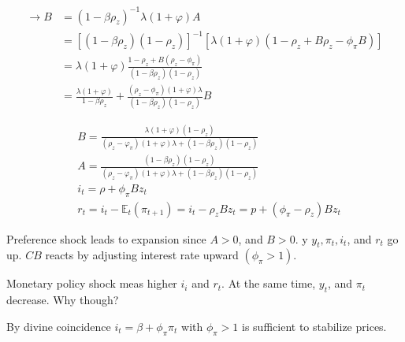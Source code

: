 {\begin{enumerate}[label=(\alph*)]
{$$
\begin{aligned}
\longrightarrow B&=\left(1-\beta \rho_z\right)^{-1} \lambda(1+\varphi) A \\
& =\left[\left(1-\beta \rho_z\right)\left(1-\rho_z\right)\right]^{-1}\left[\lambda(1+\varphi)\left(1-\rho_z+B{\rho_z}-\phi_{\pi} B\right)\right] \\
& =\lambda(1+\varphi) \frac{1-\rho_z+B\left(\rho_z-\phi_{\pi}\right)}{\left(1-\beta \rho_z\right)\left(1-\rho_z\right)} \\
& =\frac{\lambda(1+\varphi)}{1-\beta \rho_z}+\frac{\left(\rho_{z}-\phi_{\pi}\right)(1+\varphi) \lambda}{\left(1-\beta \rho_z\right)\left(1-\rho_z\right)} B
\end{aligned}
$$

$$
\begin{aligned}
& B=\frac{\lambda(1+\varphi)\left(1-\rho_{z}\right)}{\left(\rho_{z}-\varphi_{\pi}\right)(1+\varphi) \lambda+\left(1-\beta \rho_z\right)\left(1-\rho_{z}\right)} \\
& A=\frac{\left(1-\beta \rho_{z}\right)\left(1-\rho_{z}\right)}{\left(\rho_{z}-\varphi_{\pi}\right)(1+\varphi) \lambda+\left(1-\beta \rho_{z}\right)\left(1-\rho_{z}\right)} \\
& i_{t}=\rho+\phi_{\pi} B z_t \\
& r_{t}=i_{t}-\mathbb{E}_{t}\left(\pi_{t+1}\right)=i_{t}-\rho_z B z_{t}=p+\left(\phi_{\pi}-\rho_{z}\right) B z_{t}
\end{aligned}
$$
}
{
\item 
Preference shock leads to expansion since $A>0$, and $B>0$. y $y_{t}, \pi_{t}, i_{t}$, and $r_{t}$ go up. $C B$ reacts by adjusting interest rate upward $\left(\phi_{\pi}>1\right)$.

Monetary policy shock meas higher $i_{i}$ and $r_{t}$. At the same time, $y_t$, and $\pi_{t}$ decrease. \color{red} Why though? \color{black}
}
{
\item 
By divine coincidence $i_t=\beta+\phi_{\pi} \pi_{t}$ with $\phi_{\pi}>1$ is sufficient to stabilize prices.
}
\end{enumerate}
}